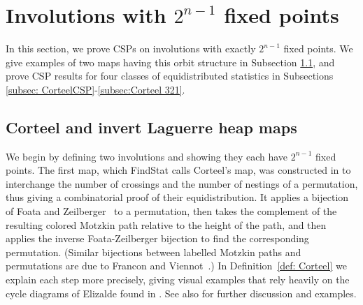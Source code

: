 \documentclass{amsart}
\theoremstyle{definition}
\begin{document}

\section{Involutions with $2^{n-1}$ fixed points}
\label{sec:corteel}
In this section, we prove CSPs on involutions with exactly $2^{n-1}$ fixed points.  We give examples of two maps having this orbit structure in Subsection \ref{subsec:CorteelLaguerre}, and prove CSP results for four classes of equidistributed statistics in Subsections \ref{subsec: CorteelCSP}-\ref{subsec:Corteel 321}.


\subsection{Corteel and invert Laguerre heap maps}\label{subsec:CorteelLaguerre}


We begin by defining two involutions and showing they each have $2^{n-1}$ fixed points.  
The first map, which FindStat calls {Corteel's map}, was constructed in \cite{corteel2007crossings} to interchange the number of crossings and the number of nestings of a permutation, thus giving  a combinatorial proof of their equidistribution.  It applies a bijection of Foata and Zeilberger~\cite{FoataZeilberger} to a permutation, then takes the complement of the resulting colored Motzkin path relative to the height of the path, and then applies the inverse Foata-Zeilberger bijection to find the corresponding permutation. (Similar bijections between labelled Motzkin paths and permutations are due to Francon and Viennot~\cite{FranconViennot1979}.)  In Definition~\ref{def: Corteel} we explain each step more precisely, giving visual examples that rely heavily on the cycle diagrams of Elizalde found in \cite{elizalde2018continued}. See also \cite[\S6]{BishalDeb} for further discussion and examples. 
\end{document}
